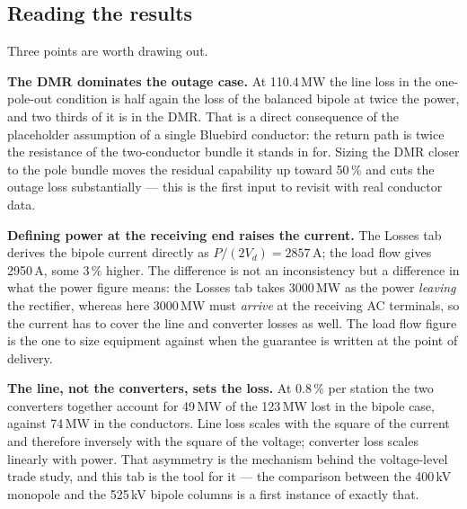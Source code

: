 \subsection{Reading the results}
Three points are worth drawing out.

\textbf{The DMR dominates the outage case.} At 110.4\,MW the line loss in the
one-pole-out condition is half again the loss of the balanced bipole at twice
the power, and two thirds of it is in the DMR. That is a direct consequence of
the placeholder assumption of a single Bluebird conductor: the return path is
twice the resistance of the two-conductor bundle it stands in for. Sizing the
DMR closer to the pole bundle moves the residual capability up toward 50\,\%
and cuts the outage loss substantially --- this is the first input to revisit
with real conductor data.

\textbf{Defining power at the receiving end raises the current.} The Losses tab
derives the bipole current directly as $P/(2V_{d}) = 2857\,\mathrm{A}$; the
load flow gives 2950\,A, some 3\,\% higher. The difference is not an
inconsistency but a difference in what the power figure means: the Losses tab
takes 3000\,MW as the power \emph{leaving} the rectifier, whereas here 3000\,MW
must \emph{arrive} at the receiving AC terminals, so the current has to cover
the line and converter losses as well. The load flow figure is the one to size
equipment against when the guarantee is written at the point of delivery.

\textbf{The line, not the converters, sets the loss.} At 0.8\,\% per station
the two converters together account for 49\,MW of the 123\,MW lost in the
bipole case, against 74\,MW in the conductors. Line loss scales with the
square of the current and therefore inversely with the square of the voltage;
converter loss scales linearly with power. That asymmetry is the mechanism
behind the voltage-level trade study, and this tab is the tool for it --- the
comparison between the 400\,kV monopole and the 525\,kV bipole columns is a
first instance of exactly that.
